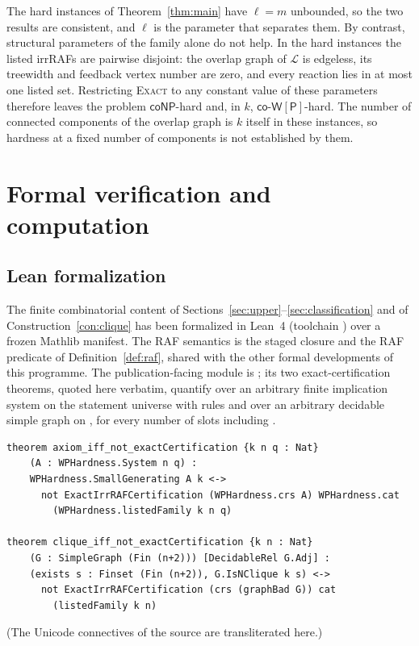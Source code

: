 \documentclass[11pt,a4paper]{article}
\theoremstyle{plain}
\theoremstyle{definition}
\theoremstyle{remark}
\newcommand{\Exact}{\textup{\textsc{Exact}}}
\newcommand{\coNP}{\mathsf{coNP}}
\newcommand{\coWP}{\mathsf{co\text{-}W[P]}}
\newcommand{\cL}{\mathcal{L}}
\begin{document}
The hard instances of Theorem~\ref{thm:main} have $\ell=m$ unbounded, so the two results are consistent, and $\ell$ is the parameter that separates them. By contrast, structural parameters of the family alone do not help. In the hard instances the listed irrRAFs are pairwise disjoint: the overlap graph of $\cL$ is edgeless, its treewidth and feedback vertex number are zero, and every reaction lies in at most one listed set. Restricting \Exact{} to any constant value of these parameters therefore leaves the problem $\coNP$-hard and, in $k$, $\coWP$-hard. The number of connected components of the overlap graph is $k$ itself in these instances, so hardness at a fixed number of components is not established by them.

\section{Formal verification and computation}\label{sec:verification}

\subsection{Lean formalization}

The finite combinatorial content of Sections~\ref{sec:upper}--\ref{sec:classification} and of Construction~\ref{con:clique} has been formalized in Lean~4 (toolchain ) over a frozen Mathlib manifest. The RAF semantics is the staged closure and the RAF predicate of Definition~\ref{def:raf}, shared with the other formal developments of this programme. The publication-facing module is ; its two exact-certification theorems, quoted here verbatim, quantify over an arbitrary finite implication system  on the statement universe  with  rules and over an arbitrary decidable simple graph on , for every number  of slots including .

\begin{small}
\begin{verbatim}
theorem axiom_iff_not_exactCertification {k n q : Nat}
    (A : WPHardness.System n q) :
    WPHardness.SmallGenerating A k <->
      not ExactIrrRAFCertification (WPHardness.crs A) WPHardness.cat
        (WPHardness.listedFamily k n q)

theorem clique_iff_not_exactCertification {k n : Nat}
    (G : SimpleGraph (Fin (n+2))) [DecidableRel G.Adj] :
    (exists s : Finset (Fin (n+2)), G.IsNClique k s) <->
      not ExactIrrRAFCertification (crs (graphBad G)) cat
        (listedFamily k n)
\end{verbatim}
\end{small}
\noindent (The Unicode connectives of the source are transliterated here.)
\end{document}
